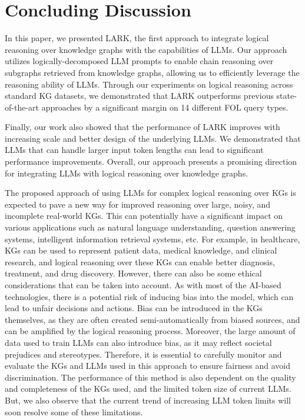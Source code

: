 \documentclass{article} %
\newcommand{\model}{LARK}
\begin{document}
\section{Concluding Discussion}
\label{sec:conclusion}
\vspace{-0.5em}
In this paper, we presented {\model}, the first approach to integrate logical reasoning over knowledge graphs with the capabilities of LLMs. Our approach utilizes logically-decomposed LLM prompts to enable chain reasoning over subgraphs retrieved from knowledge graphs, allowing us to efficiently leverage the reasoning ability of LLMs. Through our experiments on logical reasoning across standard KG datasets, we demonstrated that {\model} outperforms previous state-of-the-art approaches by a significant margin on 14 different FOL query types. {Finally, our work also showed that the performance of {\model} improves with increasing scale and better design of the underlying LLMs. We demonstrated that LLMs that can handle larger input token lengths can lead to significant performance improvements. Overall, our approach presents a promising direction for integrating LLMs with logical reasoning over knowledge graphs.

The proposed approach of using LLMs for complex logical reasoning over KGs is expected to pave a new way for improved reasoning over large, noisy, and incomplete real-world KGs. This can potentially have a significant impact on various applications such as natural language understanding, question answering systems, intelligent information retrieval systems, etc. For example, in healthcare, KGs can be used to represent patient data, medical knowledge, and clinical research, and logical reasoning over these KGs can enable better diagnosis, treatment, and drug discovery. However, there can also be some ethical considerations that can be taken into account. As with most of the AI-based technologies, there is a potential risk of inducing bias into the model, which can lead to unfair decisions and actions. Bias can be introduced in the KGs themselves, as they are often created semi-automatically from biased sources, and can be amplified by the logical reasoning process. Moreover, the large amount of data used to train LLMs can also introduce bias, as it may reflect societal prejudices and stereotypes. Therefore, it is essential to carefully monitor and evaluate the KGs and LLMs used in this approach to ensure fairness and avoid discrimination. The performance of this method is also dependent on the quality and completeness of the KGs used, and the limited token size of current LLMs. But, we also observe that the current trend of increasing LLM token limits will soon resolve some of these limitations.

}
\end{document}
